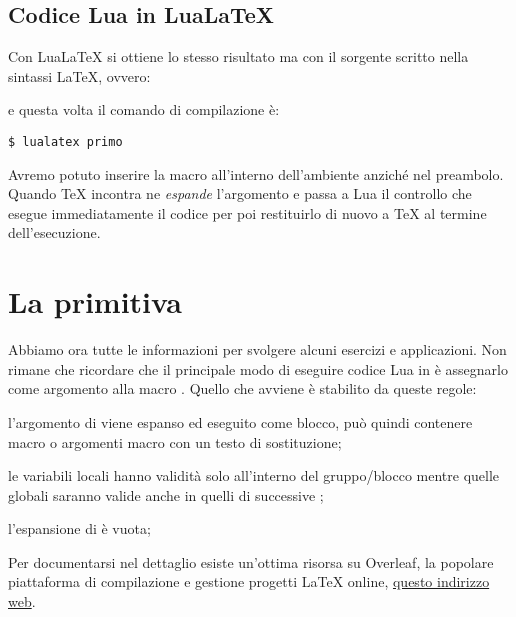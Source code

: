 \subsection{Codice Lua in Lua\LaTeX}
\label{secLuaInLuaLaTeX}

Con Lua\LaTeX{} si ottiene lo stesso risultato ma con il sorgente scritto nella
sintassi \LaTeX, ovvero:
e questa volta il comando di compilazione è:
\begin{Verbatim}[numbers=none]
$ lualatex primo
\end{Verbatim}

Avremo potuto inserire la macro all'interno dell'ambiente  anziché
nel preambolo. Quando \TeX{} incontra  ne \emph{espande}
l'argomento e passa a Lua il controllo che esegue immediatamente il codice per
poi restituirlo di nuovo a \TeX{} al termine dell'esecuzione.


\section{La primitiva }

Abbiamo ora tutte le informazioni per svolgere alcuni esercizi e applicazioni.
Non rimane che ricordare che il principale modo di eseguire codice Lua in
\LuaTeX{} è assegnarlo come argomento alla macro . Quello che
avviene è stabilito da queste regole:
\begin{compactenumerate}
\item l'argomento di  viene espanso ed eseguito come blocco, può
quindi contenere macro o argomenti macro con un testo di sostituzione;

\item le variabili locali hanno validità solo all'interno del gruppo/blocco
mentre quelle globali saranno valide anche in quelli di successive
;

\item l'espansione di  è vuota;
\end{compactenumerate}

Per documentarsi nel dettaglio esiste un'ottima risorsa su Overleaf, la popolare
piattaforma di compilazione e gestione progetti \LaTeX{} online,
\href{https://cs.overleaf.com/learn/latex/Articles/An_Introduction_to_LuaTeX_(Part_2):_Understanding_%5Cdirectlua}{questo indirizzo web}.


